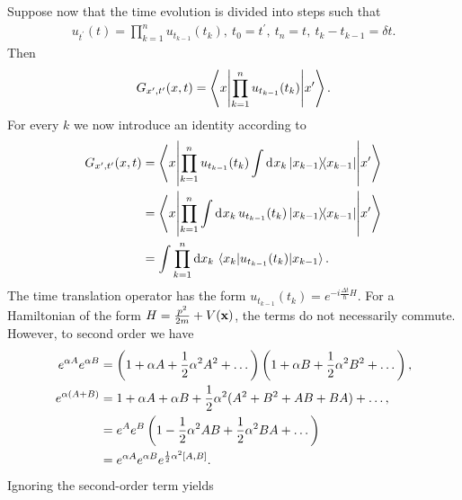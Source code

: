 Suppose now that the time evolution is divided into steps such that
\begin{align*}
	u_{t^{\prime}}(t) = \prod\limits_{k = 1}^{n}u_{t_{k - 1}}(t_{k}),\ t_{0} = t^{\prime},\ t_{n} = t,\ t_{k} - t_{k - 1} = \delta t.
\end{align*}
Then
\begin{align*}
	G_{x^{\prime}, t^{\prime}}(x, t) = \mel**{x}{\prod\limits_{k = 1}^{n}u_{t_{k - 1}}(t_{k})}{x^{\prime}}.
\end{align*}
For every $k$ we now introduce an identity according to
\begin{align*}
	G_{x^{\prime}, t^{\prime}}(x, t) &= \mel**{x}{\prod\limits_{k = 1}^{n}u_{t_{k - 1}}(t_{k})\int\limits_{}^{}\dd[]{x_{k}}\op{x_{k - 1}}{x_{k - 1}}}{x^{\prime}} \\
	                                 &= \mel**{x}{\prod\limits_{k = 1}^{n}\int\limits_{}^{}\dd[]{x_{k}}u_{t_{k - 1}}(t_{k})\op{x_{k - 1}}{x_{k - 1}}}{x^{\prime}} \\
	                                 &= \int\prod\limits_{k = 1}^{n}\dd{x_{k}}\mel{x_{k}}{u_{t_{k - 1}}(t_{k})}{x_{k - 1}}.
\end{align*}
The time translation operator has the form $u_{t_{k - 1}}(t_{k}) = e^{-i\frac{\Delta t}{\hbar}H}$. For a Hamiltonian of the form $H = \frac{p^{2}}{2m} + V(\vb{x})$, the terms do not necessarily commute. However, to second order we have
\begin{align*}
	e^{\alpha A}e^{\alpha B} &= \left(1 + \alpha A + \frac{1}{2}\alpha^{2}A^{2} + \dots\right)\left(1 + \alpha B + \frac{1}{2}\alpha^{2}B^{2} + \dots\right), \\
	e^{\alpha(A + B)}  &= 1 + \alpha A + \alpha B + \frac{1}{2}\alpha^{2}(A^{2} + B^{2} + AB + BA) + \dots, \\
	           &= e^{A}e^{B}\left(1 - \frac{1}{2}\alpha^{2}AB + \frac{1}{2}\alpha^{2}BA + \dots\right) \\
	           &= e^{\alpha A}e^{\alpha B}e^{\frac{1}{2}\alpha^{2}\comm{A}{B}}.
\end{align*}
Ignoring the second-order term yields
